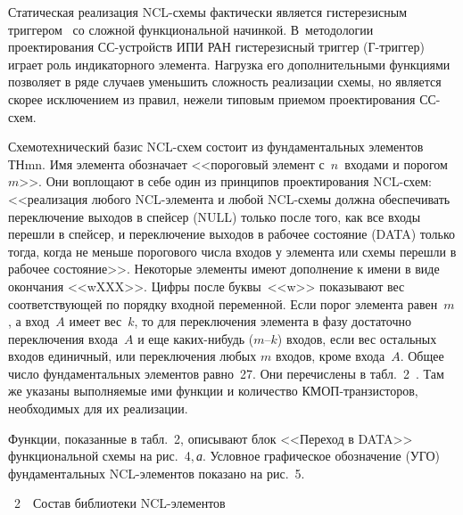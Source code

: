 \begin{multicols}{2}
       Статическая реализация NCL-схе\-мы фак\-ти\-чески является гистерезисным 
триггером~\cite{28-sok} со слож\-ной функциональной начинкой. В~методо\-логии 
проектирования СС-устройств ИПИ РАН гис\-те\-ре\-зис\-ный триггер (Г-триг\-гер) играет роль 
индикаторного элемента. Нагрузка его дополнительными функциями позволяет в ряде 
случаев уменьшить сложность реализации схемы, но является скорее исключением из 
правил, нежели типовым приемом проектирования СС-схем.


       
       Схемотехнический базис NCL-схем состоит из фундаментальных элементов ТНmn. 
Имя элемента обозначает <<пороговый элемент с~$n$~входами и порогом~$m$>>. Они 
воплощают в себе один из принципов проектирования NCL-схем: <<реализация любого 
       NCL-эле\-мен\-та и любой NCL-схе\-мы должна обеспечивать переключение 
выходов в спейсер (NULL) только после того, как все входы перешли в спейсер, и 
переключение выходов в рабочее состояние (DATA) только тогда, когда не меньше 
порогового числа входов у элемента или схемы перешли в рабочее состояние>>. Некоторые 
элементы имеют дополнение к имени в виде окончания <<wXXX>>. Цифры после 
буквы~<<w>> показывают вес соответствующей по порядку входной переменной. Если 
порог элемента равен~$m$, а вход~$A$ имеет вес~$k$, то для переключения элемента в фазу 
достаточно переключения входа~$A$ и еще каких-нибудь ($m$--$k$) входов, если вес 
остальных входов единичный, или переключения любых $m$ входов, кроме входа~$A$. 
Общее число фундаментальных элементов равно~27. Они перечислены в 
       табл.~2~\cite{68-sok}. Там же указаны выполняемые ими функции и количество 
КМОП-тран\-зис\-то\-ров, необходимых для их реализации.

 Функции, показанные в табл.~2, описывают блок <<Переход в DATA>> 
функциональной схемы на рис.~4,\,\textit{а}. Условное графическое обозначение (УГО) 
фундаментальных NCL-эле\-мен\-тов показано на рис.~5.

\vspace*{6pt}

{\small
\begin{center}
{{\tablename~2}\ \ \small{Состав библиотеки NCL-элементов}}

\vspace*{6pt}


\end{center}}
\end{multicols}
